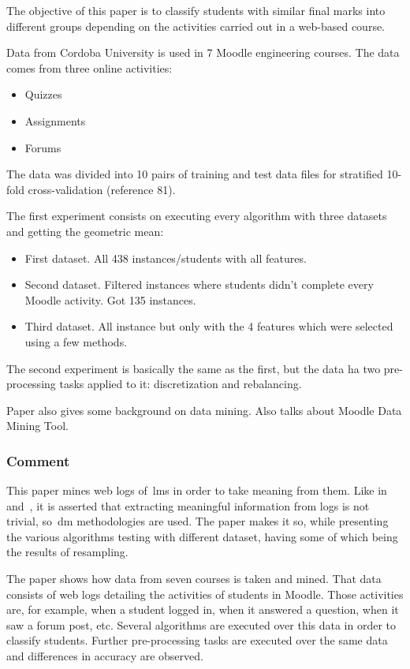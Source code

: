 The objective of this paper is to classify students with similar final marks
into different groups depending on the activities carried out in a web-based
course.

Data from Cordoba University is used in 7 Moodle engineering courses. The data
comes from three online activities:

\begin{itemize}
    \item Quizzes
    \item Assignments
    \item Forums
\end{itemize}

The data was divided into 10 pairs of training and test data files for
stratified 10-fold cross-validation (reference 81).

The first experiment consists on executing every algorithm with three datasets
and getting the geometric mean:

\begin{itemize}
    \item First dataset. All 438 instances/students with all features.
    \item Second dataset. Filtered instances where students didn't complete
        every Moodle activity. Got 135 instances.
    \item Third dataset. All instance but only with the 4 features which were
        selected using a few methods.
\end{itemize}

The second experiment is basically the same as the first, but the data ha two
pre-processing tasks applied to it: discretization and rebalancing.

Paper also gives some background on data mining. Also talks about Moodle Data
Mining Tool.

\subsubsection{Comment}

This paper mines web logs of~\gls{lms} in order to take meaning from them. Like
in~\cite{ind_001} and~\cite{ind_002}, it is asserted that extracting meaningful
information from logs is not trivial, so~\gls{dm} methodologies are used. The
paper makes it so, while presenting the various algorithms testing with
different dataset, having some of which being the results of resampling.

The paper shows how data from seven courses is taken and mined. That data
consists of web logs detailing the activities of students in Moodle. Those
activities are, for example, when a student logged in, when it answered a
question, when it saw a forum post, etc. Several algorithms are executed over
this data in order to classify students. Further pre-processing tasks are
executed over the same data and differences in accuracy are observed.


